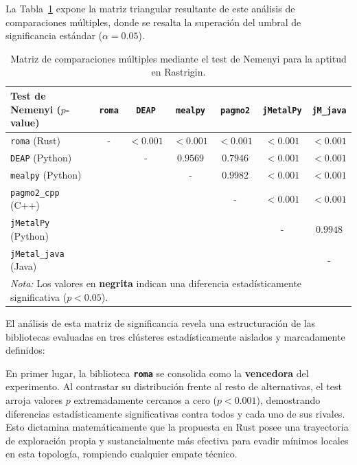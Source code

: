 \documentclass[12pt,a4paper,twoside,openright]{book}
\begin{document}
    La Tabla~\ref{tab:nemenyi_rastrigin} expone la matriz triangular resultante de este análisis de comparaciones múltiples, donde se resalta la superación del umbral de significancia estándar ($\alpha = 0.05$).

\begin{table}[htbp]
\centering
\small
\setlength{\tabcolsep}{4pt}
\begin{tabular}{l ccccc c}
\toprule
\textbf{Test de Nemenyi ($p$-value)} & \texttt{roma} & \texttt{DEAP} & \texttt{mealpy} & \texttt{pagmo2} & \texttt{jMetalPy} & \texttt{jM\_java} \\
\midrule
\texttt{roma} (Rust)         & - & $\mathbf{< 0.001}$ & $\mathbf{< 0.001}$ & $\mathbf{< 0.001}$ & $\mathbf{< 0.001}$ & $\mathbf{< 0.001}$ \\
\texttt{DEAP} (Python)       & & - & $0.9569$ & $0.7946$ & $\mathbf{< 0.001}$ & $\mathbf{< 0.001}$ \\
\texttt{mealpy} (Python)     & & & - & $0.9982$ & $\mathbf{< 0.001}$ & $\mathbf{< 0.001}$ \\
\texttt{pagmo2\_cpp} (C++)   & & & & - & $\mathbf{< 0.001}$ & $\mathbf{< 0.001}$ \\
\texttt{jMetalPy} (Python)   & & & & & - & $0.9948$ \\
\texttt{jMetal\_java} (Java) & & & & & & - \\
\bottomrule
\multicolumn{7}{l}{\scriptsize \textit{Nota:} Los valores en \textbf{negrita} indican una diferencia estadísticamente significativa ($p < 0.05$).}
\end{tabular}
\caption{Matriz de comparaciones múltiples mediante el test de Nemenyi para la aptitud en Rastrigin.}
\label{tab:nemenyi_rastrigin}
\end{table}

    El análisis de esta matriz de significancia revela una estructuración de las bibliotecas evaluadas en tres clústeres estadísticamente aislados y marcadamente definidos:

    En primer lugar, la biblioteca \textbf{\texttt{roma}} se consolida como la \textbf{vencedora} del experimento. Al contrastar su distribución frente al resto de alternativas, el test arroja valores $p$ extremadamente cercanos a cero ($p < 0.001$), demostrando diferencias estadísticamente significativas contra todos y cada uno de sus rivales. Esto dictamina matemáticamente que la propuesta en Rust posee una trayectoria de exploración propia y sustancialmente más efectiva para evadir mínimos locales en esta topología, rompiendo cualquier empate técnico.
\end{document}
